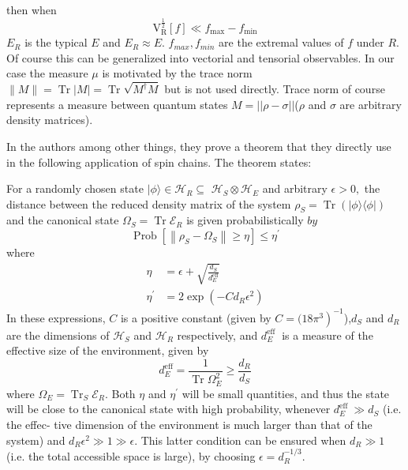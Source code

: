\documentclass[a4paper,12pt]{article}
\begin{document}
then when 
\begin{equation}\mathrm{V}_{\mathrm{R}}^{\frac{1}{2}}[f] \ll f_{\max }-f_{\min }
\end{equation}
$E_R$ is the typical $E$ and $E_R \approx E$. $f_{max}, f_{min}$ are the extremal values of $f$ under $R$. Of course this can be generalized into vectorial and tensorial observables. In our case the measure $\mu$ is motivated by the trace norm $\|M\|=\operatorname{Tr}|M|=\operatorname{Tr} \sqrt{M^{\dagger} M}$ but is not used directly. Trace norm of course represents a measure between quantum states $M=||\rho-\sigma||$($\rho$ and $\sigma$ are arbitrary density matrices).\par
In \cite{popescu2006entanglement} the authors among other things, they prove a theorem that they directly use in the following application of spin chains. The theorem states: 
\begin{theorem}
\label{theorem}
For a randomly chosen state $|\phi\rangle \in \mathcal{H}_{R} \subseteq$ $\mathcal{H}_{S} \otimes \mathcal{H}_{E}$ and arbitrary $\epsilon>0,$ the distance between the reduced density matrix of the system $\rho_{S}=\operatorname{Tr}(|\phi\rangle\langle\phi|)$ and
the canonical state $\Omega_{S}=\operatorname{Tr} \mathcal{E}_{R}$ is given probabilistically
$b y$
\[
\operatorname{Prob}\left[\left\|\rho_{S}-\Omega_{S}\right\| \geq \eta\right] \leq \eta^{\prime}
\]
where
\[
\begin{aligned}
\eta &=\epsilon+\sqrt{\frac{d_{S}}{d_{E}^{\mathrm{eff}}}} \\
\eta^{\prime} &=2 \exp \left(-C d_{R} \epsilon^{2}\right)
\end{aligned}
\]
In these expressions, $C$ is a positive constant (given by $\left.C=(18 \pi^{3}\right)^{-1}$),$d_{S}$ and $d_{R}$ are the dimensions of $\mathcal{H}_{S}$ and $\mathcal{H}_{R}$ respectively, and $d_{E}^{\text {eff }}$ is a measure of the effective size of the environment, given by
\[
d_{E}^{\mathrm{eff}}=\frac{1}{\operatorname{Tr} \Omega_{E}^{2}} \geq \frac{d_{R}}{d_{S}}
\]
where $\Omega_{E}=\operatorname{Tr}_{S} \mathcal{E}_{R} .$ Both $\eta$ and $\eta^{\prime}$ will be small quantities, and thus the state will be close to the canonical state
with high probability, whenever $d_{E}^{\text {eff }} \gg d_{S}$ (i.e. the effec-
tive dimension of the environment is much larger than that of the system) and $d_{R} \epsilon^{2} \gg 1 \gg \epsilon .$ This latter condition can be ensured when $d_{R} \gg 1$ (i.e. the total accessible
space is large), by choosing $\epsilon=d_{R}^{-1 / 3}$.
\end{theorem}
\end{document}
